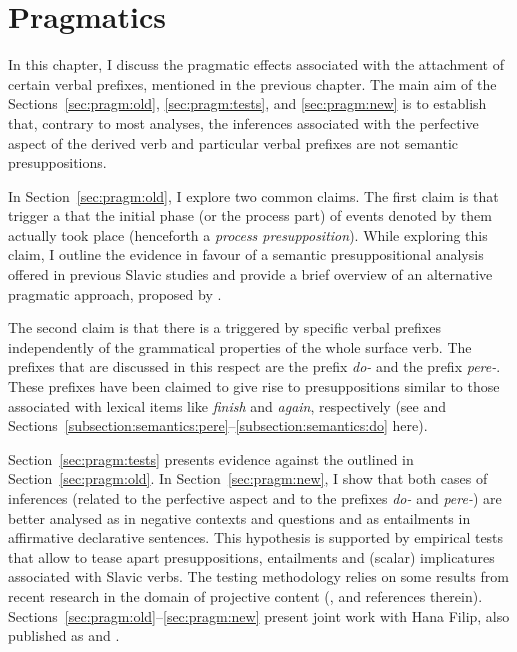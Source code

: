 \chapter{Pragmatics} %
\label{Chapter6}
In this chapter, I discuss the pragmatic effects associated with the attachment of certain verbal prefixes, mentioned in the previous chapter. The main aim of the Sections~\ref{sec:pragm:old}, \ref{sec:pragm:tests}, and \ref{sec:pragm:new} is to establish that, contrary to most analyses, the inferences associated with the perfective aspect of the derived verb and particular verbal prefixes are not semantic presuppositions. 

In Section~\ref{sec:pragm:old}, I explore two common claims. The first claim is that  trigger a  that the initial phase (or the process part) of events denoted by them actually took place (henceforth a \textit{process presupposition}). While exploring this claim, I outline the evidence in favour of a semantic presuppositional analysis offered in previous Slavic studies and provide a brief overview of an alternative pragmatic approach, proposed by \citet{Gronn:04, Gronn:06}.

The second claim is that there is a  triggered by specific verbal prefixes independently of the grammatical properties of the whole surface verb. The prefixes that are discussed in this respect are the  prefix \textit{do-} and the  prefix \textit{pere-}. These prefixes have been claimed to give rise to presuppositions similar to those associated with lexical items like \textit{finish} and \textit{again}, respectively (see \citealt{Kagan:book} and Sections~\ref{subsection:semantics:pere}--\ref{subsection:semantics:do} here).

Section~\ref{sec:pragm:tests} presents evidence against the  outlined in Section~\ref{sec:pragm:old}. In Section~\ref{sec:pragm:new}, I show that both cases of inferences (related to the perfective aspect and to the prefixes \textit{do-} and \textit{pere-}) are better analysed as  in negative contexts and questions and as entailments in affirmative declarative sentences. This hypothesis is supported by empirical tests that allow to tease apart presuppositions, entailments and (scalar) implicatures associated with Slavic verbs. The testing methodology relies on some results from recent research in the domain of projective content (\citealp{Schlenker:08, Chemla:09, Romoli:11}, and references therein). Sections~\ref{sec:pragm:old}--\ref{sec:pragm:new} present joint work with Hana Filip, also published as \citealt{ZinovaFilip:SALT} and \citealt{ZinovaFilip:14}. %

